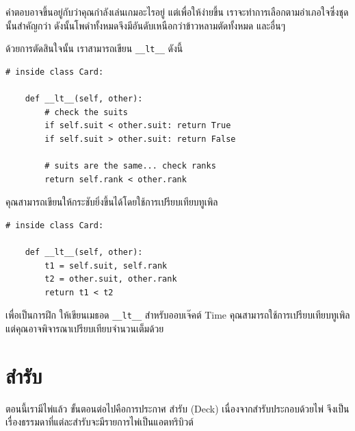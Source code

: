 คำตอบอาจขึ้นอยู่กับว่าคุณกำลังเล่นเกมอะไรอยู่ แต่เพื่อให้ง่ายขึ้น เราจะทำการเลือกตามอำเภอใจซึ่งชุดนั้นสำคัญกว่า ดังนั้นโพดำทั้งหมดจึงมีอันดับเหนือกว่าข้าวหลามตัดทั้งหมด และอื่นๆ


ด้วยการตัดสินใจนั้น เราสามารถเขียน \verb"__lt__" ดังนี้

\begin{verbatim}
# inside class Card:

    def __lt__(self, other):
        # check the suits
        if self.suit < other.suit: return True
        if self.suit > other.suit: return False

        # suits are the same... check ranks
        return self.rank < other.rank
\end{verbatim}
%
คุณสามารถเขียนให้กระชับยิ่งขึ้นได้โดยใช้การเปรียบเทียบทูเพิล

\begin{verbatim}
# inside class Card:

    def __lt__(self, other):
        t1 = self.suit, self.rank
        t2 = other.suit, other.rank
        return t1 < t2
\end{verbatim}
%
เพื่อเป็นการฝึก ให้เขียนเมธอด \verb"__lt__" สำหรับออบเจ๊คต์ Time คุณสามารถใช้การเปรียบเทียบทูเพิล แต่คุณอาจพิจารณาเปรียบเทียบจำนวนเต็มด้วย 

\section{สำรับ}

ตอนนี้เรามีไพ่แล้ว ขั้นตอนต่อไปคือการประกาศ สำรับ (Deck) เนื่องจากสำรับประกอบด้วยไพ่ จึงเป็นเรื่องธรรมดาที่แต่ละสำรับจะมีรายการไพ่เป็นแอตทริบิวต์ 

